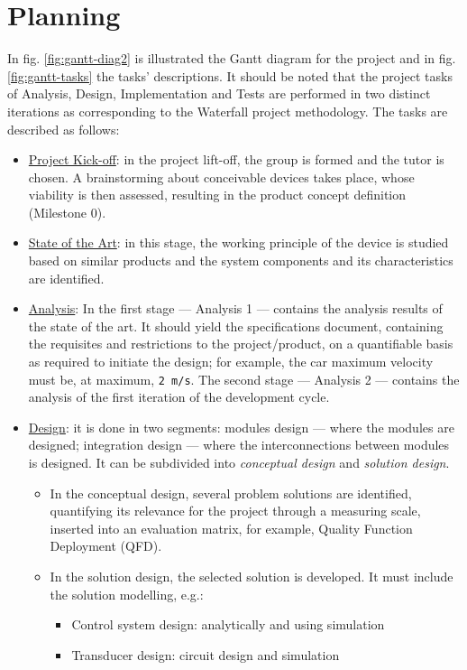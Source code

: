 \documentclass[11pt]{article}
\begin{document}
\section{Planning}
\label{sec:orga82318d}
In fig. \ref{fig:gantt-diag2} is illustrated the Gantt diagram for the project and in
fig. \ref{fig:gantt-tasks} the tasks' descriptions. It should be noted that the project
tasks of Analysis, Design, Implementation and Tests are performed in two
distinct iterations as corresponding to the Waterfall project methodology. The
tasks are described as follows:
\begin{itemize}
\item \uline{Project Kick-off}: in the project lift-off, the group is formed and the tutor
is chosen. A brainstorming about conceivable devices takes place, whose
viability is then assessed, resulting in the product concept definition
(Milestone 0).
\item \uline{State of the Art}: in this stage, the working principle of the device is
studied based on similar products and the system components and its
characteristics are identified.
\item \uline{Analysis}: In the first stage --- Analysis 1 --- contains the analysis
results of the state of the art. It should yield the specifications document,
containing the requisites and restrictions to the project/product, on a
quantifiable basis as required to initiate the design; for example, the
car maximum velocity must be, at maximum, \texttt{2 m/s}. The second stage --- Analysis 2
--- contains the analysis of the first iteration of the development cycle.
\item \uline{Design}: it is done in two segments: modules design --- where the modules are
designed; integration design --- where the interconnections between modules is
designed. It can be subdivided into \emph{conceptual design} and \emph{solution
design}. 
\begin{itemize}
\item In the conceptual design, several problem solutions are identified,
quantifying its relevance for the project through a measuring scale,
inserted into an evaluation matrix, for example, Quality Function Deployment
(QFD).
\item In the solution design, the selected solution is developed. It must include
the solution modelling, e.g.:
\begin{itemize}
\item Control system design: analytically and using simulation
\item Transducer design: circuit design and simulation

\end{itemize}
\end{itemize}
\end{itemize}
\end{document}
